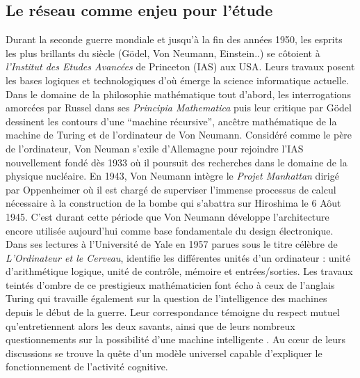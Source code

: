 \subsection[Le réseau comme enjeu pour l{\textquoteright}étude]{Le réseau comme enjeu pour l{\textquoteright}étude}
Durant la seconde guerre mondiale et jusqu{\textquoteright}à la fin des années 1950, les esprits les plus brillants du siècle (G\"odel, Von Neumann, Einstein..) se c\^otoient à \textit{l{\textquoteright}Institut des Etudes Avancées} de Princeton (IAS) aux USA. Leurs travaux posent les bases logiques et technologiques d{\textquoteright}o\`u émerge la science informatique actuelle. Dans le domaine de la philosophie mathématique tout d{\textquoteright}abord, les interrogations amorcées par Russel dans ses \textit{Principia Mathematica }puis leur critique par G\"odel dessinent les contours d{\textquoteright}une {\textquotedblleft}machine récursive{\textquotedblright}, anc\^etre mathématique de la machine de Turing et de l{\textquoteright}ordinateur de Von Neumann. Considéré comme le père de l{\textquoteright}ordinateur, Von Neuman s{\textquoteright}exile d{\textquoteright}Allemagne pour rejoindre l{\textquoteright}IAS nouvellement fondé dès 1933 o\`u il poursuit des recherches dans le domaine de la physique nucléaire. En 1943, Von Neumann intègre le \textit{Projet Manhattan} dirigé par Oppenheimer o\`u il est chargé de superviser l{\textquoteright}immense processus de calcul nécessaire à la construction de la bombe qui s{\textquoteright}abattra sur Hiroshima le 6 A\^out 1945. C{\textquoteright}est durant cette période que Von Neumann développe l{\textquoteright}architecture encore utilisée aujourd{\textquoteright}hui comme base fondamentale du design électronique. Dans ses lectures à l{\textquoteright}Université de Yale en 1957 parues sous le titre célèbre de \textit{L{\textquoteright}Ordinateur et le Cerveau}, \cite{Neumann1958} identifie les différentes unités d{\textquoteright}un ordinateur : unité d{\textquoteright}arithmétique logique, unité de contr\^ole, mémoire et entrées/sorties. Les travaux teintés d{\textquoteright}ombre de ce prestigieux mathématicien font écho à ceux de l{\textquoteright}anglais Turing qui travaille également sur la question de l{\textquoteright}intelligence des machines depuis le début de la guerre. Leur correspondance témoigne du respect mutuel qu{\textquoteright}entretiennent alors les deux savants, ainsi que de leurs nombreux questionnements sur la possibilité d{\textquoteright}une machine intelligente \citep{Istrail2013}. Au c{\oe}ur de leurs discussions se trouve la qu\^ete d{\textquoteright}un modèle universel capable d{\textquoteright}expliquer le fonctionnement de l{\textquoteright}activité cognitive.  

